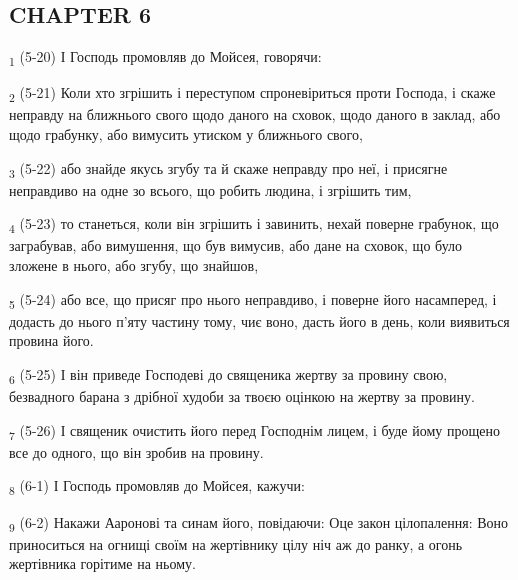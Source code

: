 \subsection{CHAPTER 6}
\begin{tcolorbox}
\textsubscript{1} (5-20) І Господь промовляв до Мойсея, говорячи:
\end{tcolorbox}
\begin{tcolorbox}
\textsubscript{2} (5-21) Коли хто згрішить і переступом спроневіриться проти Господа, і скаже неправду на ближнього свого щодо даного на сховок, щодо даного в заклад, або щодо грабунку, або вимусить утиском у ближнього свого,
\end{tcolorbox}
\begin{tcolorbox}
\textsubscript{3} (5-22) або знайде якусь згубу та й скаже неправду про неї, і присягне неправдиво на одне зо всього, що робить людина, і згрішить тим,
\end{tcolorbox}
\begin{tcolorbox}
\textsubscript{4} (5-23) то станеться, коли він згрішить і завинить, нехай поверне грабунок, що заграбував, або вимушення, що був вимусив, або дане на сховок, що було зложене в нього, або згубу, що знайшов,
\end{tcolorbox}
\begin{tcolorbox}
\textsubscript{5} (5-24) або все, що присяг про нього неправдиво, і поверне його насамперед, і додасть до нього п'яту частину тому, чиє воно, дасть його в день, коли виявиться провина його.
\end{tcolorbox}
\begin{tcolorbox}
\textsubscript{6} (5-25) І він приведе Господеві до священика жертву за провину свою, безвадного барана з дрібної худоби за твоєю оцінкою на жертву за провину.
\end{tcolorbox}
\begin{tcolorbox}
\textsubscript{7} (5-26) І священик очистить його перед Господнім лицем, і буде йому прощено все до одного, що він зробив на провину.
\end{tcolorbox}
\begin{tcolorbox}
\textsubscript{8} (6-1) І Господь промовляв до Мойсея, кажучи:
\end{tcolorbox}
\begin{tcolorbox}
\textsubscript{9} (6-2) Накажи Ааронові та синам його, повідаючи: Оце закон цілопалення: Воно приноситься на огнищі своїм на жертівнику цілу ніч аж до ранку, а огонь жертівника горітиме на ньому.
\end{tcolorbox}
